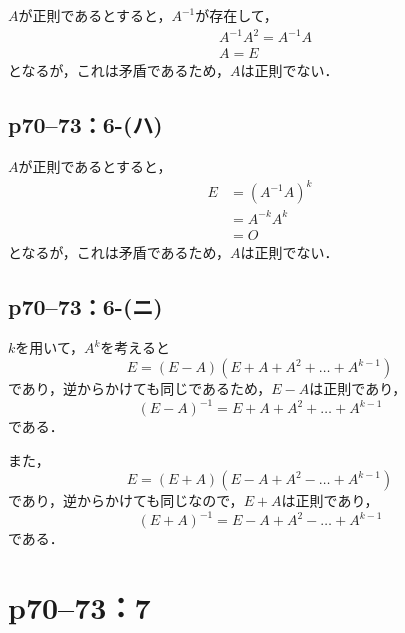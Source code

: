 \begin{tproof}
  $A$が正則であるとすると，$A^{-1}$が存在して，
  \begin{align*}
     & A^{-1} A^{2} = A^{-1} A \\
     & A = E
  \end{align*}
  となるが，これは矛盾であるため，$A$は正則でない．
\end{tproof}

\subsection*{p70--73：6-(ハ)}

\begin{tproof}
  $A$が正則であるとすると，
  \begin{align*}
    E & = (A^{-1} A)^{k} \\
      & = A^{-k} A^{k}   \\
      & = O
  \end{align*}
  となるが，これは矛盾であるため，$A$は正則でない．
\end{tproof}

\subsection*{p70--73：6-(ニ)}

\begin{tproof}
  $k$を用いて，$A^k$を考えると
  \[
    E = (E-A)(E+A+A^2+\dots+A^{k-1})
  \]
  であり，逆からかけても同じであるため，$E-A$は正則であり，
  \[
    (E-A)^{-1}=E+A+A^2+\dots+A^{k-1}
  \]
  である．

  また，
  \[
    E=(E+A)(E-A+A^2-\dots+A^{k-1})
  \]
  であり，逆からかけても同じなので，$E+A$は正則であり，
  \[
    (E+A)^{-1} = E-A+A^2-\dots+A^{k-1}
  \]
  である．
\end{tproof}



\section*{p70--73：7}

